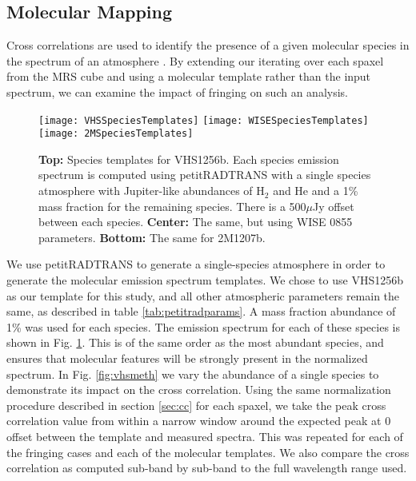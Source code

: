 \subsection{Molecular Mapping}
Cross correlations are used to identify the presence of a given molecular species in the spectrum of an atmosphere \parencite{Hoeijmakers2018,Haffert2019}.
By extending our iterating over each spaxel from the MRS cube and using a molecular template rather than the input spectrum, we can examine the impact of fringing on such an analysis.
\begin{figure}[t]
	\texttt{[image: VHSSpeciesTemplates]}
	\texttt{[image: WISESpeciesTemplates]}
	\texttt{[image: 2MSpeciesTemplates]}
	\caption{\textbf{Top:} Species templates for VHS1256b. Each species emission spectrum is computed using petitRADTRANS with a single species atmosphere with Jupiter-like abundances of H$_{2}$ and He and a 1\% mass fraction for the remaining species. There is a 500$\mu$Jy offset between each species. \textbf{Center:} The same, but using WISE 0855 parameters. \textbf{Bottom:} The same for 2M1207b.}
	\label{fig:speciestemplates}
\end{figure}

We use petitRADTRANS to generate a single-species atmosphere in order to generate the molecular emission spectrum templates. 
We chose to use VHS1256b as our template for this study, and all other atmospheric parameters remain the same, as described in table \ref{tab:petitradparams}. 
A mass fraction abundance of 1\% was used for each species.
The emission spectrum for each of these species is shown in Fig. \ref{fig:speciestemplates}.
This is of the same order as the most abundant species, and ensures that molecular features will be strongly present in the normalized spectrum.
In Fig. \ref{fig:vhsmeth} we vary the abundance of a single species to demonstrate its impact on the cross correlation.
Using the same normalization procedure described in section \ref{sec:cc} for each spaxel, we take the peak cross correlation value from within a narrow window around the expected peak at 0 offset between the template and measured spectra. 
This was repeated for each of the fringing cases and each of the molecular templates. 
We also compare the cross correlation as computed sub-band by sub-band to the full wavelength range used.
\clearpage
